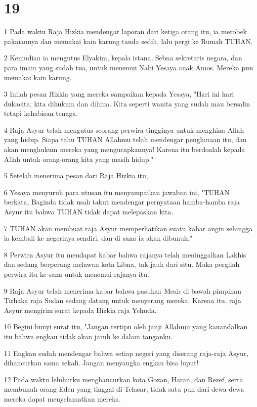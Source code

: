 \chapter{19}

\par 1 Pada waktu Raja Hizkia mendengar laporan dari ketiga orang itu, ia merobek pakaiannya dan memakai kain karung tanda sedih, lalu pergi ke Rumah TUHAN.
\par 2 Kemudian ia mengutus Elyakim, kepala istana, Sebna sekretaris negara, dan para imam yang sudah tua, untuk menemui Nabi Yesaya anak Amos. Mereka pun memakai kain karung.
\par 3 Inilah pesan Hizkia yang mereka sampaikan kepada Yesaya, "Hari ini hari dukacita; kita dihukum dan dihina. Kita seperti wanita yang sudah mau bersalin tetapi kehabisan tenaga.
\par 4 Raja Asyur telah mengutus seorang perwira tingginya untuk menghina Allah yang hidup. Siapa tahu TUHAN Allahmu telah mendengar penghinaan itu, dan akan menghukum mereka yang mengucapkannya! Karena itu berdoalah kepada Allah untuk orang-orang kita yang masih hidup."
\par 5 Setelah menerima pesan dari Raja Hizkia itu,
\par 6 Yesaya menyuruh para utusan itu menyampaikan jawaban ini, "TUHAN berkata, Baginda tidak usah takut mendengar pernyataan hamba-hamba raja Asyur itu bahwa TUHAN tidak dapat melepaskan kita.
\par 7 TUHAN akan membuat raja Asyur memperhatikan suatu kabar angin sehingga ia kembali ke negerinya sendiri, dan di sana ia akan dibunuh."
\par 8 Perwira Asyur itu mendapat kabar bahwa rajanya telah meninggalkan Lakhis dan sedang berperang melawan kota Libna, tak jauh dari situ. Maka pergilah perwira itu ke sana untuk menemui rajanya itu.
\par 9 Raja Asyur telah menerima kabar bahwa pasukan Mesir di bawah pimpinan Tirhaka raja Sudan sedang datang untuk menyerang mereka. Karena itu, raja Asyur mengirim surat kepada Hizkia raja Yehuda.
\par 10 Begini bunyi surat itu, "Jangan tertipu oleh janji Allahmu yang kauandalkan itu bahwa engkau tidak akan jatuh ke dalam tanganku.
\par 11 Engkau sudah mendengar bahwa setiap negeri yang diserang raja-raja Asyur, dihancurkan sama sekali. Jangan menyangka engkau bisa luput!
\par 12 Pada waktu leluhurku menghancurkan kota Gozan, Haran, dan Rezef, serta membunuh orang Eden yang tinggal di Telasar, tidak satu pun dari dewa-dewa mereka dapat menyelamatkan mereka.
